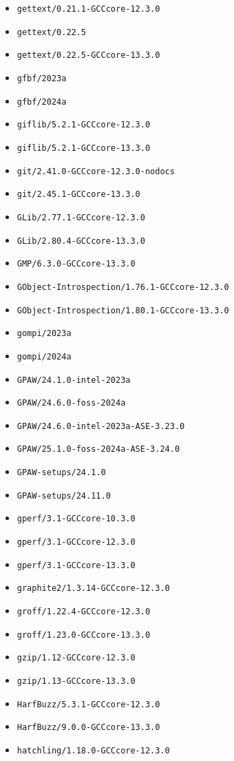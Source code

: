 \begin{multicols}{3}
\begin{itemize}
\item \verb|gettext/0.21.1-GCCcore-12.3.0|
\item \verb|gettext/0.22.5|
\item \verb|gettext/0.22.5-GCCcore-13.3.0|
\item \verb|gfbf/2023a|
\item \verb|gfbf/2024a|
\item \verb|giflib/5.2.1-GCCcore-12.3.0|
\item \verb|giflib/5.2.1-GCCcore-13.3.0|
\item \verb|git/2.41.0-GCCcore-12.3.0-nodocs|
\item \verb|git/2.45.1-GCCcore-13.3.0|
\item \verb|GLib/2.77.1-GCCcore-12.3.0|
\item \verb|GLib/2.80.4-GCCcore-13.3.0|
\item \verb|GMP/6.3.0-GCCcore-13.3.0|
\item \verb|GObject-Introspection/1.76.1-GCCcore-12.3.0|
\item \verb|GObject-Introspection/1.80.1-GCCcore-13.3.0|
\item \verb|gompi/2023a|
\item \verb|gompi/2024a|
\item \verb|GPAW/24.1.0-intel-2023a|
\item \verb|GPAW/24.6.0-foss-2024a|
\item \verb|GPAW/24.6.0-intel-2023a-ASE-3.23.0|
\item \verb|GPAW/25.1.0-foss-2024a-ASE-3.24.0|
\item \verb|GPAW-setups/24.1.0|
\item \verb|GPAW-setups/24.11.0|
\item \verb|gperf/3.1-GCCcore-10.3.0|
\item \verb|gperf/3.1-GCCcore-12.3.0|
\item \verb|gperf/3.1-GCCcore-13.3.0|
\item \verb|graphite2/1.3.14-GCCcore-12.3.0|
\item \verb|groff/1.22.4-GCCcore-12.3.0|
\item \verb|groff/1.23.0-GCCcore-13.3.0|
\item \verb|gzip/1.12-GCCcore-12.3.0|
\item \verb|gzip/1.13-GCCcore-13.3.0|
\item \verb|HarfBuzz/5.3.1-GCCcore-12.3.0|
\item \verb|HarfBuzz/9.0.0-GCCcore-13.3.0|
\item \verb|hatchling/1.18.0-GCCcore-12.3.0|

\end{itemize}
\end{multicols}

